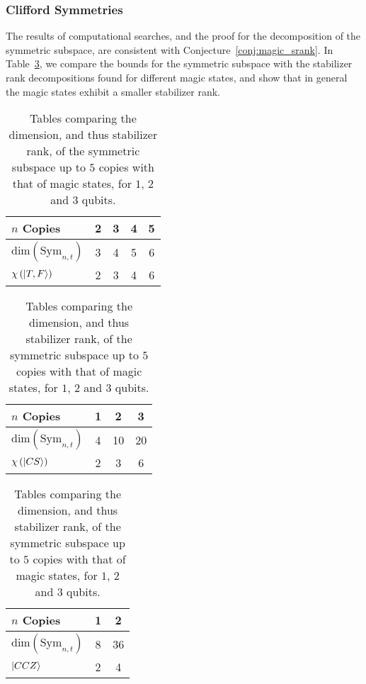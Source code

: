 \subsubsection*{Clifford Symmetries}
The results of computational searches, and the proof for the decomposition of the symmetric subspace, are consistent with Conjecture~\ref{conj:magic_srank}. In Table~\ref{tab:srank_tables}, we compare the bounds for the symmetric subspace with the stabilizer rank decompositions found for different magic states, and show that in general the magic states exhibit a smaller stabilizer rank.\par
\begin{table}[H]
\centering
    \begin{subtable}[t]{0.6\textwidth}
    \caption{}
    \centering
        \begin{tabular}{|l|c|c|c|c|}
            \hline
            $n$ Copies & 2 & 3 & 4 & 5 \\
            \hline
            $\text{dim}\left(\text{Sym}_{n,t}\right)$ & 3 & 4 & 5 & 6 \\
            $\chi\left(\ket{T,F}\right)$ & 2 & 3 & 4 & 6 \\ \hline
        \end{tabular}
    \end{subtable}
    \vspace{1cm}
    \begin{subtable}[t]{0.48\textwidth}
    \centering
        \begin{tabular}{|l|c|c|c|}
            \hline
            $n$ Copies & 1 & 2 & 3 \\ \hline
            $\text{dim}\left(\text{Sym}_{n,t}\right)$ & 4 & 10 & 20 \\
            $\chi\left(\ket{CS}\right)$ & 2 & 3 & 6 \\ \hline
        \end{tabular}
        \caption{}
    \end{subtable}
    \begin{subtable}[t]{0.48\textwidth}
    \centering
        \begin{tabular}{|l|c|c|}
            \hline
            $n$ Copies & 1 & 2 \\ \hline
            $\text{dim}\left(\text{Sym}_{n,t}\right)$ & 8 & 36 \\
            $\ket{CCZ}$ & 2 & 4 \\ \hline
        \end{tabular}
        \caption{}
    \end{subtable}
    \caption{Tables comparing the dimension, and thus stabilizer rank, of the symmetric subspace up to $5$ copies with that of magic states, for $1$, $2$ and $3$ qubits.}
\label{tab:srank_tables}
\end{table}

